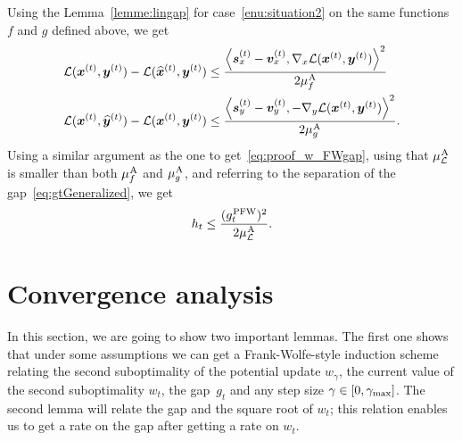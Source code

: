 \documentclass[twoside]{article}
\renewcommand{\L}{\mathcal{L}}
\newcommand{\prodscal}[2]{\left\langle#1,#2\right\rangle}
\newcommand{\xt}{\bm{x}^{(t)}}
\newcommand{\st}{\bm{s}^{(t)}}
\newcommand{\vt}{\bm{v}^{(t)}}
\newcommand{\yt}{\bm{y}^{(t)}}
\newcommand{\xtm}{\widehat{\bm{x}}^{(t)}}
\newcommand{\ytm}{\widehat{\bm{y}}^{(t)}}
\newcommand{\gap}{g_{t}}
\newcommand{\stepsize}{\gamma}
\newcommand{\stepmax}{\stepsize_{\textnormal{\scriptsize max}}} %
\newcommand{\PW}{{\hspace{0.05em}\textnormal{PFW}}}
\newcommand{\away}{{\hspace{0.05em}\textnormal{A}}}
\newcommand{\0}{\mathbf{0}} %
\begin{document}
    Using the Lemma~\ref{lemme:lingap} for case~\eqref{enu:situation2} on the same functions $f$ and $g$ defined above, we get
      \begin{align*}
        \L(\xt, \yt) - \L(\xtm,\yt)  & \leq  \frac{  \prodscal{\st_x - \vt_x }{\nabla_x \L(\xt,\yt)}^2 }{2 \mu^{\away}_{f}}  \\
        \L(\xt, \ytm) - \L(\xt,\yt)  & \leq   \frac{  \prodscal{\st_y -\vt_y }{-\nabla_y \L(\xt,\yt)}^2 }{2 \mu^{\away}_{g}}.
      \end{align*}
    Using a similar argument as the one to get~\eqref{eq:proof_w_FWgap}, using that $\mu^{\away}_\L$ is smaller than both $\mu^{\away}_{f}$ and $\mu^{\away}_{g}$, and referring to the separation of the gap~\eqref{eq:gtGeneralized}, we get
      \begin{equation} 
       h_t \leq \frac{ (\gap^{\PW})^2}{2 \mu^{\away}_\L}.
      \end{equation}

  \endproof



%

\section{Convergence analysis}
\label{appendix:analysis}
In this section, we are going to show two important lemmas. The first one shows that under some assumptions we can get a Frank-Wolfe-style induction scheme relating the second suboptimality of the potential update $w_{\gamma}$, the current value of the second suboptimality $w_t$, the gap~$\gap$ and any step size $\gamma \in [0,\stepmax]$. The second lemma will relate the gap and the square root of $w_t$; this relation enables us to get a rate on the gap after getting a rate on $w_t$.
\end{document}
